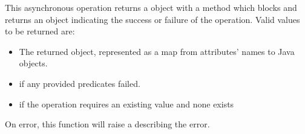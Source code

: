 This asynchronous operation returns a  object with a
 method which blocks and returns an object indicating the
success or failure of the operation.  Valid values to be returned are:

\begin{itemize}[noitemsep]
\item The returned object, represented as a map from attributes' names to Java
    objects.
\item {} if any provided predicates failed.
\item {} if the operation requires an existing value and none exists
\end{itemize}

On error, this function will raise a  describing
the error.
